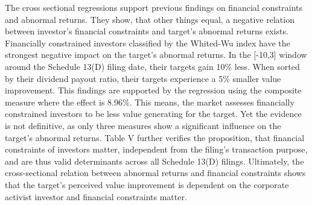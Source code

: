 \documentclass[12pt]{article}
\begin{document}
The cross sectional regressions support previous findings on financial constraints and abnormal returns. They show, that other things equal, a negative relation between investor's financial constraints and target's abnormal returns exists. Financially constrained investors classified by the Whited-Wu index have the strongest negative impact on the target's abnormal returns. In the [-10,3] window around the Schedule 13(D) filing date, their targets gain 10\% less. When sorted by their dividend payout ratio, their targets experience a 5\% smaller value improvement. This findings are supported by the regression using the composite measure where the effect is 8.96\%. This means, the market assesses financially constrained investors to be less value generating for the target. Yet the evidence is not definitive, as only three measures show a significant influence on the target's abnormal returns. Table V further verifies the proposition, that financial constraints of investors matter, independent from the filing's transaction purpose, and are thus valid determinants across all Schedule 13(D) filings. Ultimately, the cross-sectional relation between abnormal returns and financial constraints shows that the target's perceived value improvement is dependent on the corporate activist investor and financial constraints matter.
\pagebreak
\end{document}
